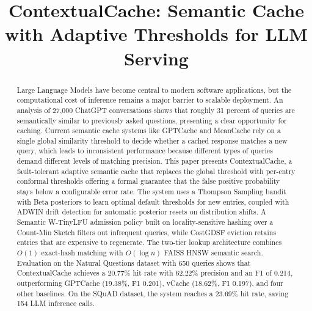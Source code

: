 \documentclass[conference]{IEEEtran}
\begin{document}
\title{ContextualCache: Semantic Cache with Adaptive Thresholds for LLM Serving}

\author{
\and
{}
}

\maketitle

\begin{abstract}
Large Language Models have become central to modern software applications, but the computational cost of inference remains a major barrier to scalable deployment. An analysis of 27,000 ChatGPT conversations shows that roughly 31 percent of queries are semantically similar to previously asked questions, presenting a clear opportunity for caching. Current semantic cache systems like GPTCache and MeanCache rely on a single global similarity threshold to decide whether a cached response matches a new query, which leads to inconsistent performance because different types of queries demand different levels of matching precision. This paper presents ContextualCache, a fault-tolerant adaptive semantic cache that replaces the global threshold with per-entry conformal thresholds offering a formal guarantee that the false positive probability stays below a configurable error rate. The system uses a Thompson Sampling bandit with Beta posteriors to learn optimal default thresholds for new entries, coupled with ADWIN drift detection for automatic posterior resets on distribution shifts. A Semantic W-TinyLFU admission policy built on locality-sensitive hashing over a Count-Min Sketch filters out infrequent queries, while CostGDSF eviction retains entries that are expensive to regenerate. The two-tier lookup architecture combines $O(1)$ exact-hash matching with $O(\log n)$ FAISS HNSW semantic search. Evaluation on the Natural Questions dataset with 650 queries shows that ContextualCache achieves a 20.77\% hit rate with 62.22\% precision and an F1 of 0.214, outperforming GPTCache (19.38\%, F1 0.201), vCache (18.62\%, F1 0.197), and four other baselines. On the SQuAD dataset, the system reaches a 23.69\% hit rate, saving 154 LLM inference calls.
\end{abstract}
\end{document}
